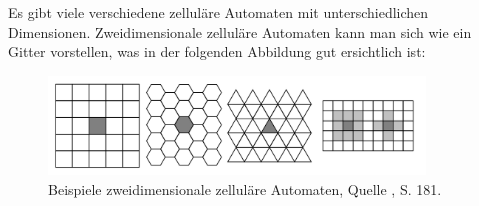 Es gibt viele verschiedene zelluläre Automaten mit unterschiedlichen Dimensionen. Zweidimensionale zelluläre Automaten kann man sich wie ein Gitter vorstellen, was in der folgenden Abbildung gut ersichtlich ist: \\
\begin{figure}[h]
\centering
\includegraphics[width=10cm]{2_ZA_Beispiel.png}
\caption[Zweidimensionale zelluläre Automaten]{Beispiele zweidimensionale zelluläre Automaten, Quelle \cite{book:bungartz}, S. 181.}
\end{figure}

